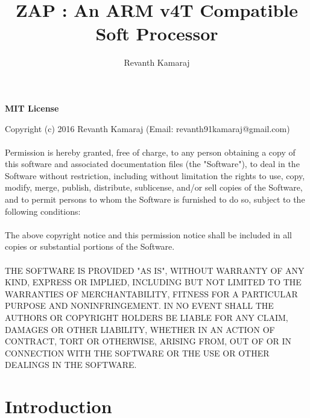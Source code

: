 \documentclass[11pt]{article}
\begin{document}
\sloppy

\title{ ZAP : An ARM v4T Compatible Soft Processor }
\author{Revanth Kamaraj}

\begin{titlepage}
\clearpage\maketitle
\thispagestyle{empty}
\maketitle
\end{titlepage}

\begin{center}
\textbf{MIT License} \\
\end{center}
Copyright (c) 2016 Revanth Kamaraj (Email: revanth91kamaraj@gmail.com) \\\\
Permission is hereby granted, free of charge, to any person obtaining a copy
of this software and associated documentation files (the "Software"), to deal
in the Software without restriction, including without limitation the rights
to use, copy, modify, merge, publish, distribute, sublicense, and/or sell
copies of the Software, and to permit persons to whom the Software is
furnished to do so, subject to the following conditions: \\\\
The above copyright notice and this permission notice shall be included in all
copies or substantial portions of the Software. \\\\
THE SOFTWARE IS PROVIDED "AS IS", WITHOUT WARRANTY OF ANY KIND, EXPRESS OR
IMPLIED, INCLUDING BUT NOT LIMITED TO THE WARRANTIES OF MERCHANTABILITY,
FITNESS FOR A PARTICULAR PURPOSE AND NONINFRINGEMENT. IN NO EVENT SHALL THE
AUTHORS OR COPYRIGHT HOLDERS BE LIABLE FOR ANY CLAIM, DAMAGES OR OTHER
LIABILITY, WHETHER IN AN ACTION OF CONTRACT, TORT OR OTHERWISE, ARISING FROM,
OUT OF OR IN CONNECTION WITH THE SOFTWARE OR THE USE OR OTHER DEALINGS IN THE
SOFTWARE.


\pagebreak
\tableofcontents

\pagebreak
\section{Introduction}
\end{document}
